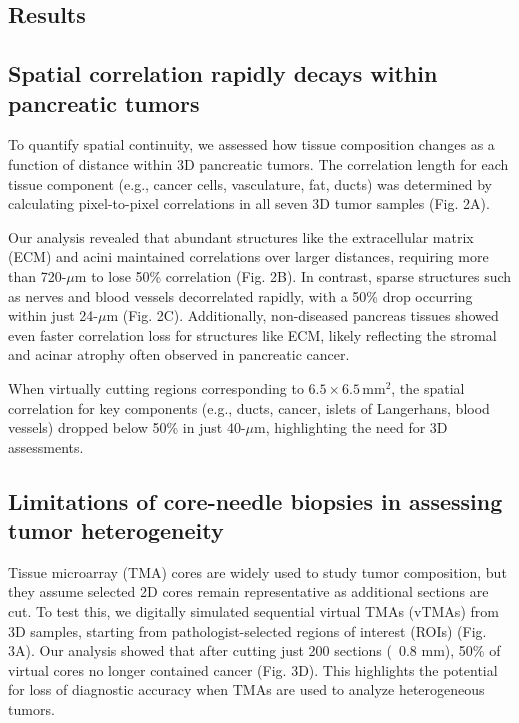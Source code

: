 \begin{refsection}
    \section{Results}

    \subsection{Spatial correlation rapidly decays within pancreatic tumors}
    To quantify spatial continuity, we assessed how tissue composition changes as a function of distance within 3D pancreatic tumors. The correlation length for each tissue component (e.g., cancer cells, vasculature, fat, ducts) was determined by calculating pixel-to-pixel correlations in all seven 3D tumor samples (Fig. 2A).

    Our analysis revealed that abundant structures like the extracellular matrix (ECM) and acini maintained correlations over larger distances, requiring more than 720-\( \mu \text{m} \) to lose 50\% correlation (Fig. 2B). In contrast, sparse structures such as nerves and blood vessels decorrelated rapidly, with a 50\% drop occurring within just 24-\( \mu \text{m} \) (Fig. 2C). Additionally, non-diseased pancreas tissues showed even faster correlation loss for structures like ECM, likely reflecting the stromal and acinar atrophy often observed in pancreatic cancer.

    When virtually cutting regions corresponding to \( 6.5 \times 6.5 \, \text{mm}^2 \), the spatial correlation for key components (e.g., ducts, cancer, islets of Langerhans, blood vessels) dropped below 50\% in just 40-\( \mu \text{m} \), highlighting the need for 3D assessments.

    \subsection{Limitations of core-needle biopsies in assessing tumor heterogeneity}
    Tissue microarray (TMA) cores are widely used to study tumor composition, but they assume selected 2D cores remain representative as additional sections are cut. To test this, we digitally simulated sequential virtual TMAs (vTMAs) from 3D samples, starting from pathologist-selected regions of interest (ROIs) (Fig. 3A). Our analysis showed that after cutting just 200 sections (~0.8 mm), 50\% of virtual cores no longer contained cancer (Fig. 3D). This highlights the potential for loss of diagnostic accuracy when TMAs are used to analyze heterogeneous tumors.


\end{refsection}
